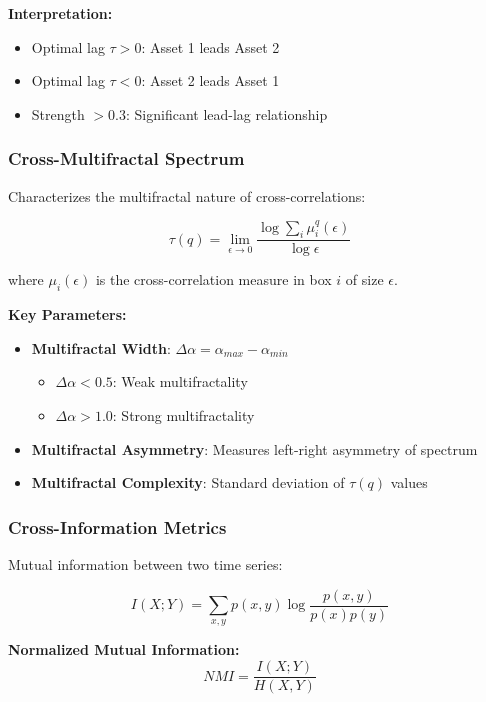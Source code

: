 \documentclass[11pt,a4paper]{article}
\begin{document}
\textbf{Interpretation:}
\begin{itemize}
    \item Optimal lag $\tau > 0$: Asset 1 leads Asset 2
    \item Optimal lag $\tau < 0$: Asset 2 leads Asset 1
    \item Strength $> 0.3$: Significant lead-lag relationship
\end{itemize}

\subsubsection{Cross-Multifractal Spectrum}

Characterizes the multifractal nature of cross-correlations:

\begin{equation}
\tau(q) = \lim_{\epsilon \to 0} \frac{\log \sum_i \mu_i^q(\epsilon)}{\log \epsilon}
\end{equation}

where $\mu_i(\epsilon)$ is the cross-correlation measure in box $i$ of size $\epsilon$.

\textbf{Key Parameters:}
\begin{itemize}
    \item \textbf{Multifractal Width}: $\Delta\alpha = \alpha_{max} - \alpha_{min}$
    \begin{itemize}
        \item $\Delta\alpha < 0.5$: Weak multifractality
        \item $\Delta\alpha > 1.0$: Strong multifractality
    \end{itemize}
    \item \textbf{Multifractal Asymmetry}: Measures left-right asymmetry of spectrum
    \item \textbf{Multifractal Complexity}: Standard deviation of $\tau(q)$ values
\end{itemize}

\subsubsection{Cross-Information Metrics}

Mutual information between two time series:

\begin{equation}
I(X;Y) = \sum_{x,y} p(x,y) \log \frac{p(x,y)}{p(x)p(y)}
\end{equation}

\textbf{Normalized Mutual Information:}
\begin{equation}
NMI = \frac{I(X;Y)}{H(X,Y)}
\end{equation}
\end{document}
